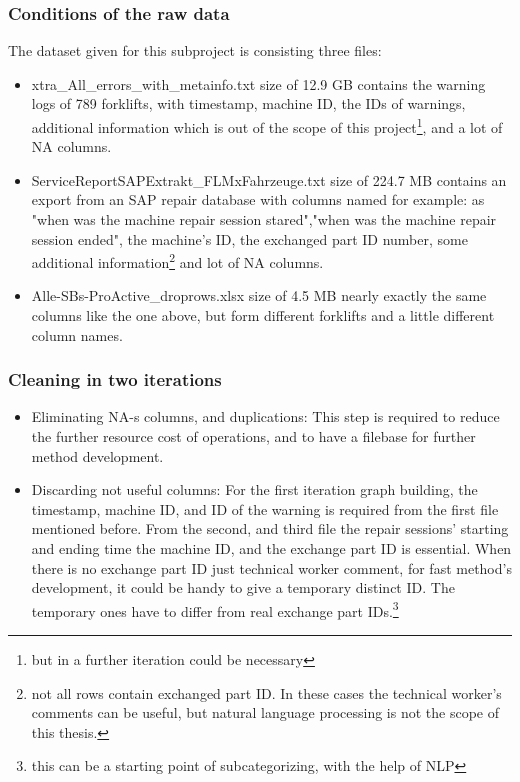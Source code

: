 		\subsubsection{Conditions of the raw data}
		The dataset given for this subproject is consisting three files:
		\begin{itemize}
			\item{xtra\_All\_errors\_with\_metainfo.txt} size of 12.9 GB contains the warning logs of 789 forklifts, with timestamp, machine ID, the IDs of warnings, additional information which is out of the scope of this project\footnote{but in a further iteration could be necessary}, and a lot of NA columns.
			\item{ServiceReportSAPExtrakt\_FLMxFahrzeuge.txt} size of 224.7 MB contains an export from an SAP repair database with columns named for example: as "when was the machine repair session stared","when was the machine repair session ended", the machine's ID, the exchanged part ID number, some additional information\footnote{not all rows contain exchanged part ID. In these cases the technical worker's comments can be useful, but natural language processing is not the scope of this thesis.} and lot of NA columns.
			\item{Alle-SBs-ProActive\_droprows.xlsx} size of 4.5 MB nearly exactly the same columns like the one above, but form different forklifts and a little different column names.
		\end{itemize}
		\subsubsection{Cleaning in two iterations}
		\begin{itemize}
			\item{Eliminating NA-s columns, and duplications:} This step is required to reduce the further resource cost of operations, and to have a filebase for further method development.
			\item{Discarding not useful columns:} For the first iteration graph building, the timestamp, machine ID, and ID of the warning is required from the first file mentioned before. From the second, and third file the repair sessions' starting and ending time the machine ID, and the exchange part ID is essential. When there is no exchange part ID just technical worker comment, for fast method's development, it could be handy to give a temporary distinct ID. The temporary ones have to differ from real exchange part IDs.\footnote{this can be a starting point of subcategorizing, with the help of NLP} 
		\end{itemize}
